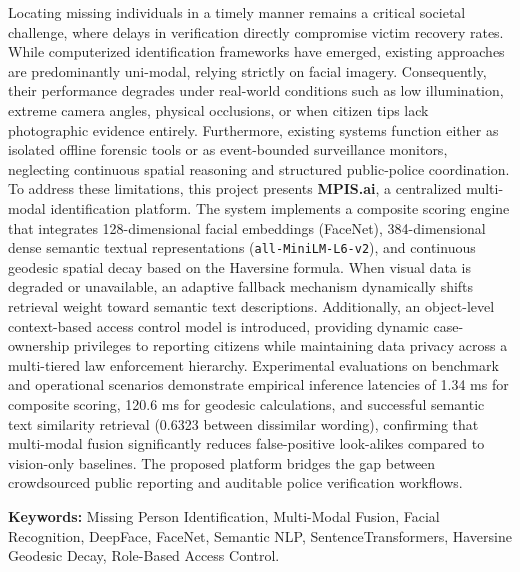 \documentclass[12pt,a4paper]{report}
\begin{document}
\noindent Locating missing individuals in a timely manner remains a critical societal challenge, where delays in verification directly compromise victim recovery rates. While computerized identification frameworks have emerged, existing approaches are predominantly uni-modal, relying strictly on facial imagery. Consequently, their performance degrades under real-world conditions such as low illumination, extreme camera angles, physical occlusions, or when citizen tips lack photographic evidence entirely. Furthermore, existing systems function either as isolated offline forensic tools or as event-bounded surveillance monitors, neglecting continuous spatial reasoning and structured public-police coordination. To address these limitations, this project presents \textbf{MPIS.ai}, a centralized multi-modal identification platform. The system implements a composite scoring engine that integrates 128-dimensional facial embeddings (FaceNet), 384-dimensional dense semantic textual representations (\texttt{all-MiniLM-L6-v2}), and continuous geodesic spatial decay based on the Haversine formula. When visual data is degraded or unavailable, an adaptive fallback mechanism dynamically shifts retrieval weight toward semantic text descriptions. Additionally, an object-level context-based access control model is introduced, providing dynamic case-ownership privileges to reporting citizens while maintaining data privacy across a multi-tiered law enforcement hierarchy. Experimental evaluations on benchmark and operational scenarios demonstrate empirical inference latencies of 1.34 ms for composite scoring, 120.6 ms for geodesic calculations, and successful semantic text similarity retrieval (0.6323 between dissimilar wording), confirming that multi-modal fusion significantly reduces false-positive look-alikes compared to vision-only baselines. The proposed platform bridges the gap between crowdsourced public reporting and auditable police verification workflows.

\vspace{0.2in}
\noindent\textbf{Keywords:} Missing Person Identification, Multi-Modal Fusion, Facial Recognition, DeepFace, FaceNet, Semantic NLP, SentenceTransformers, Haversine Geodesic Decay, Role-Based Access Control.

\newpage
\tableofcontents

\newpage
\listoffigures
\end{document}
